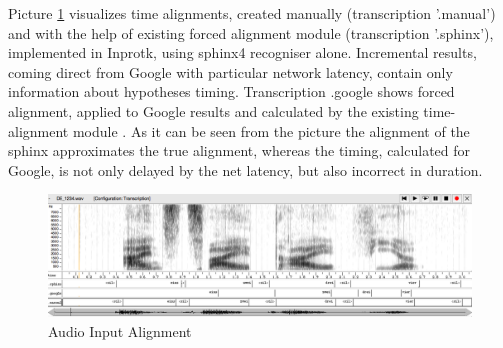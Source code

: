 Picture \ref {fig:Bild2}  visualizes time alignments, created manually
(transcription '.manual') and with the help of existing forced alignment module
(transcription '.sphinx'), implemented in Inprotk, using sphinx4 recogniser
alone. Incremental results, coming direct from Google with particular network
latency, contain only information about hypotheses timing. Transcription .google
shows forced alignment, applied to Google results and calculated
by the existing time-alignment module \parencite {baumannetal2009:naacl}.  As it
can be seen from the picture the alignment of the sphinx approximates the true
alignment, whereas the timing, calculated for Google, is not only delayed by the
net latency, but also incorrect in duration. 

 \begin{figure}[htbp]
  \centering
     \includegraphics[width=1.0\textwidth]{images/wave2.png}
  \caption{Audio Input Alignment}
  \label{fig:Bild2}
\end{figure}

